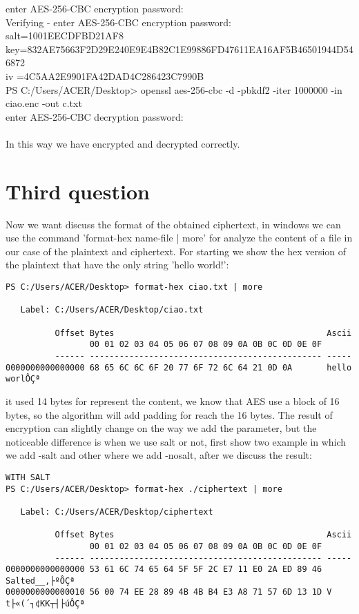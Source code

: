 \documentclass{article}
\begin{document}
enter AES-256-CBC encryption password:\\
Verifying - enter AES-256-CBC encryption password:\\
salt=1001EECDFBD21AF8\\
key=832AE75663F2D29E240E9E4B82C1E99886FD47611EA16AF5B46501944D546872\\
iv =4C5AA2E9901FA42DAD4C286423C7990B\\
PS C:/Users/ACER/Desktop> openssl aes-256-cbc -d -pbkdf2 -iter 1000000 -in ciao.enc -out c.txt\\
enter AES-256-CBC decryption password:\\
\\
In this way we have encrypted and decrypted correctly.

\section{Third question}
Now we want discuss the format of the obtained ciphertext, in windows we can use the command 'format-hex name-file | more' for analyze the content of a file in our case of the plaintext and ciphertext. For starting we show the hex version of the plaintext that have the only string 'hello world!':
\begin{lstlisting}[basicstyle=\tiny]
PS C:/Users/ACER/Desktop> format-hex ciao.txt | more

   Label: C:/Users/ACER/Desktop/ciao.txt

          Offset Bytes                                           Ascii
                 00 01 02 03 04 05 06 07 08 09 0A 0B 0C 0D 0E 0F
          ------ ----------------------------------------------- -----
0000000000000000 68 65 6C 6C 6F 20 77 6F 72 6C 64 21 0D 0A       hello worlÔÇª
\end{lstlisting}
it used 14 bytes for represent the content, we know that AES use a block of 16 bytes, so the algorithm will add padding for reach the 16 bytes. The result of encryption can slightly change on the way we add the parameter, but the noticeable difference is when we use salt or not, first show two example in which we add -salt and other where we add -nosalt, after we discuss the result:\\
\begin{lstlisting}[basicstyle=\tiny]
WITH SALT
PS C:/Users/ACER/Desktop> format-hex ./ciphertext | more

   Label: C:/Users/ACER/Desktop/ciphertext

          Offset Bytes                                           Ascii
                 00 01 02 03 04 05 06 07 08 09 0A 0B 0C 0D 0E 0F
          ------ ----------------------------------------------- -----
0000000000000000 53 61 6C 74 65 64 5F 5F 2C E7 11 E0 2A ED 89 46 Salted__,├ºÔÇª
0000000000000010 56 00 74 EE 28 89 4B 4B B4 E3 A8 71 57 6D 13 1D V t├«(´┐¢KK┬┤├úÔÇª
\end{lstlisting}
\end{document}
